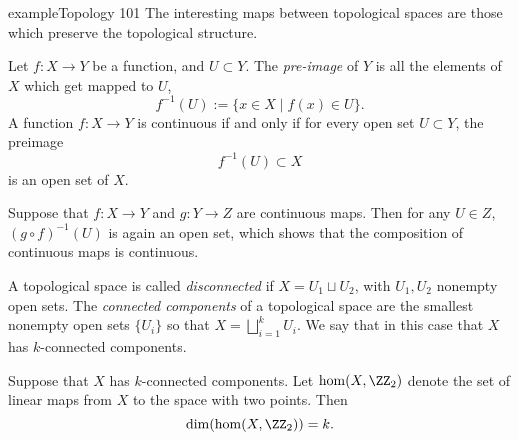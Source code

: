 \begin{doubledpage}{example}{Topology 101}
The interesting maps between topological spaces are those which preserve the topological structure. 
\begin{definition}
    Let $f: X\to Y$ be a function, and $U\subset Y$. The \emph{pre-image} of $Y$ is all the elements of $X$ which get mapped to $U$, 
    \[f^{-1}(U):=\{x\in X\;|\; f(x)\in U\}.\]
    A function $f: X\to Y$ is continuous if and only if for every open set $U\subset Y$, the preimage 
    \[f^{-1}(U)\subset X\]
    is an open set of $X$. 
    \end{definition}
    Suppose that $f: X\to Y$ and $g: Y\to Z$ are continuous maps. Then for any $U\in Z$, $(g\circ f)^{-1}(U)$ is again an open set, which shows that the composition of continuous maps is continuous. 

    A topological space is called \emph{disconnected} if $X=U_1\sqcup U_2$, with $U_1, U_2$ nonempty open sets. The \emph{connected components} of a topological space are the smallest nonempty open sets $\{U_i\}$ so that $X=\bigsqcup_{i=1}^k U_i$. We say that in this case that $X$ has $k$-connected components. 
    \begin{theorem}
        Suppose that $X$ has $k$-connected components. Let $\hom(X, \ZZ_2)$ denote the set of linear maps from $X$ to the space with two points. Then
        \[\dim(\hom(X, \ZZ_2))=k.\] 
    \end{theorem}
\end{doubledpage}